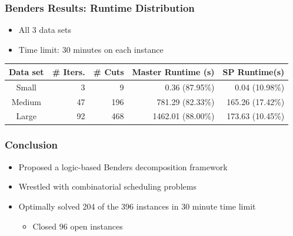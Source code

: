 \documentclass{beamer}
\begin{document}
\begin{frame}
\frametitle{Benders Results: Runtime Distribution}
\begin{itemize}
	\item All 3 data sets\vspace{1mm}
	\item Time limit: 30 minutes on each instance
\end{itemize}
\begin{table}
	\centering
	\begin{tabular}{crrrr}
		\toprule
		Data set & \# Iters. & \# Cuts & Master Runtime (s) & SP Runtime(s) \\\midrule\midrule
		Small & 3 & 9 & 0.36 (87.95\%) & 0.04 (10.98\%) \\
		Medium & 47 & 196 & 781.29 (82.33\%) & 165.26 (17.42\%) \\
		Large & 92 & 468 & 1462.01 (88.00\%) & 173.63 (10.45\%) \\
		\bottomrule
	\end{tabular}
\end{table}
\end{frame}

\begin{frame}
\frametitle{Conclusion}
\begin{itemize}
	\item Proposed a logic-based Benders decomposition framework\vspace{3mm}\pause
	\item Wrestled with combinatorial scheduling problems\vspace{3mm}\pause
	\item Optimally solved 204 of the 396 instances in 30 minute time limit\vspace{2mm}
	\begin{itemize}
		\item {\color{red} Closed 96 open instances}
	\end{itemize}
\end{itemize}
\end{frame}
\end{document}
